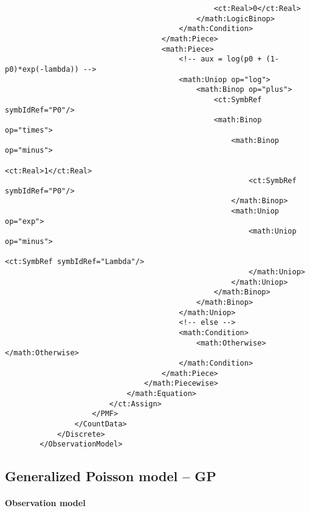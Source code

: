 \begin{lstlisting}
                                                <ct:Real>0</ct:Real>
                                            </math:LogicBinop>
                                        </math:Condition>
                                    </math:Piece>
                                    <math:Piece>
                                        <!-- aux = log(p0 + (1-p0)*exp(-lambda)) -->
                                        <math:Uniop op="log">
                                            <math:Binop op="plus">
                                                <ct:SymbRef symbIdRef="P0"/>
                                                <math:Binop op="times">
                                                    <math:Binop op="minus">
                                                        <ct:Real>1</ct:Real>
                                                        <ct:SymbRef symbIdRef="P0"/>
                                                    </math:Binop>
                                                    <math:Uniop op="exp">
                                                        <math:Uniop op="minus">
                                                            <ct:SymbRef symbIdRef="Lambda"/>
                                                        </math:Uniop>
                                                    </math:Uniop>
                                                </math:Binop>
                                            </math:Binop>
                                        </math:Uniop>
                                        <!-- else -->
                                        <math:Condition>
                                            <math:Otherwise></math:Otherwise>
                                        </math:Condition>
                                    </math:Piece>
                                </math:Piecewise>
                            </math:Equation>
                        </ct:Assign>
                    </PMF>
                </CountData>
            </Discrete>
        </ObservationModel>
\end{lstlisting}



\subsection{Generalized Poisson model -- GP}
\label{subsec:GPmodel}

\paragraph{Observation model}

